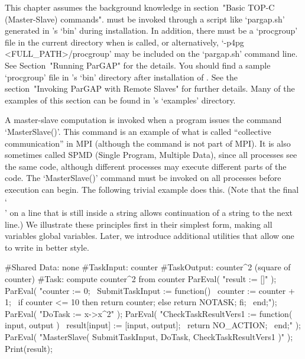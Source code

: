 

This chapter assumes the background  knowledge  in  section~"Basic  TOP-C
(Master-Slave) commands". {\ParGAP} must be invoked through a script like
`pargap.sh'  generated  in  {\ParGAP}'s  `bin'  during  installation.  In
addition, there must be a `procgroup' file in the current directory  when
{\ParGAP} is called, or alternatively, `-p4pg <FULL_PATH>/procgroup'  may
be included on the `pargap.sh' command line. See Section~"Running ParGAP"
for the details. You should find a sample `procgroup' file in {\ParGAP}'s
`bin'   directory   after   installation   of    {\ParGAP}.    See    the
section~"Invoking ParGAP with Remote Slaves" for further details. Many of
the examples of this section  can  be  found  in  {\ParGAP}'s  `examples'
directory.


A master-slave computation is invoked when a {\ParGAP} program issues the
command `MasterSlave()'. This command is an example  of  what  is  called
``collective communication'' in MPI (although the command is not part  of
MPI). It is also sometimes called SPMD (Single Program,  Multiple  Data),
since all processes see the same code, although different  processes  may
execute different parts of the code. The `MasterSlave()' command must  be
invoked on all  processes  before  execution  can  begin.  The  following
trivial example does this. (Note that the final `\\' on a  line  that  is
still inside a string allows continuation of a string to the next  line.)
We illustrate these principles first in their simplest form,  making  all
variables global variables.  Later,  we  introduce  additional  {\ParGAP}
utilities that allow one to write in better style.

\beginexample
#Shared Data: none
#TaskInput:   counter
#TaskOutput:  counter^2 (square of counter)
#Task:        compute counter^2 from counter
ParEval( "result := []" );
ParEval( "counter := 0; \
          SubmitTaskInput := function() \
            counter := counter + 1; \
            if counter <= 10 then return counter; else return NOTASK; fi; \
          end;");
ParEval( "DoTask := x->x^2" );
ParEval( "CheckTaskResultVers1 := function( input, output ) \
            result[input] := [input, output]; \
            return NO_ACTION; \
          end;" );
ParEval( "MasterSlave( SubmitTaskInput, DoTask, CheckTaskResultVers1 )" );
Print(result);
\endexample


